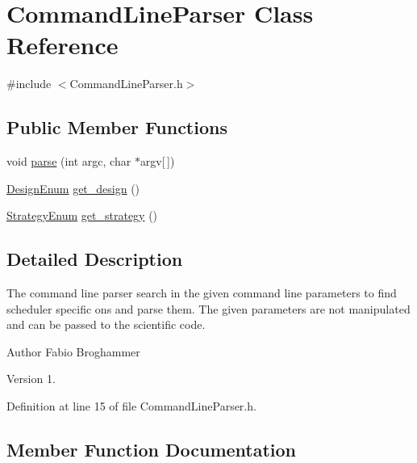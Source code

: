 \hypertarget{class_command_line_parser}{}\section{Command\+Line\+Parser Class Reference}
\label{class_command_line_parser}


{\ttfamily \#include $<$Command\+Line\+Parser.\+h$>$}

\subsection*{Public Member Functions}
\begin{DoxyCompactItemize}
\item 
void \hyperlink{class_command_line_parser_a90a8555f0902b43fcea52671f9c98883}{parse} (int argc, char $\ast$argv\mbox{[}$\,$\mbox{]})
\item 
\hyperlink{_design_enum_8h_aefcba5d81ba393e442410d16ebe78ac7}{Design\+Enum} \hyperlink{class_command_line_parser_a8399461d8c096889f5d37045b5935921}{get\+\_\+design} ()
\item 
\hyperlink{_strategy_enum_8h_aa770fe6711c27326278b9e4ab326cd10}{Strategy\+Enum} \hyperlink{class_command_line_parser_a55e3200ff40b200cebfeb4dc645319df}{get\+\_\+strategy} ()
\end{DoxyCompactItemize}


\subsection{Detailed Description}
The command line parser search in the given command line parameters to find scheduler specific ons and parse them. The given parameters are not manipulated and can be passed to the scientific code.

\begin{DoxyAuthor}{Author}
Fabio Broghammer 
\end{DoxyAuthor}
\begin{DoxyVersion}{Version}
1. 
\end{DoxyVersion}


Definition at line 15 of file Command\+Line\+Parser.\+h.



\subsection{Member Function Documentation}
\hypertarget{class_command_line_parser_a8399461d8c096889f5d37045b5935921}{}
